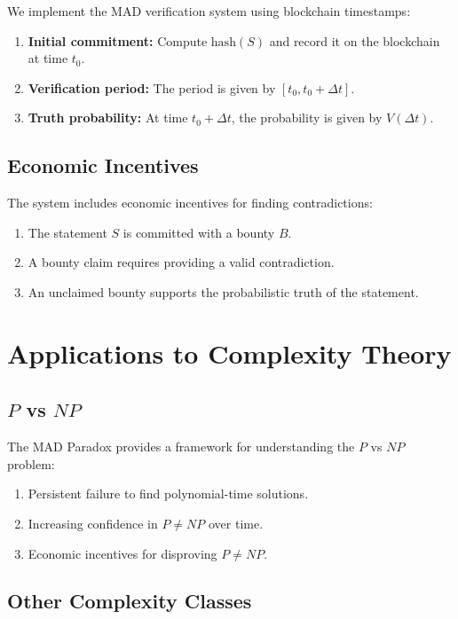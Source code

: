 \documentclass[11pt]{article}
\begin{document}
We implement the MAD verification system using blockchain timestamps:
\begin{enumerate}[label=(\arabic*)]
    \item \textbf{Initial commitment:} Compute $\mathrm{hash}(S)$ and record it on the blockchain at time $t_0$.
    \item \textbf{Verification period:} The period is given by $[t_0, t_0+\Delta t]$.
    \item \textbf{Truth probability:} At time $t_0+\Delta t$, the probability is given by $V(\Delta t)$.
\end{enumerate}

\subsection{Economic Incentives}

The system includes economic incentives for finding contradictions:
\begin{enumerate}[label=(\arabic*)]
    \item The statement $S$ is committed with a bounty $B$.
    \item A bounty claim requires providing a valid contradiction.
    \item An unclaimed bounty supports the probabilistic truth of the statement.
\end{enumerate}

\section{Applications to Complexity Theory}

\subsection{$P$ vs $NP$}

The MAD Paradox provides a framework for understanding the $P$ vs $NP$ problem:
\begin{enumerate}[label=(\arabic*)]
    \item Persistent failure to find polynomial-time solutions.
    \item Increasing confidence in $P \neq NP$ over time.
    \item Economic incentives for disproving $P \neq NP$.
\end{enumerate}

\subsection{Other Complexity Classes}
\end{document}
